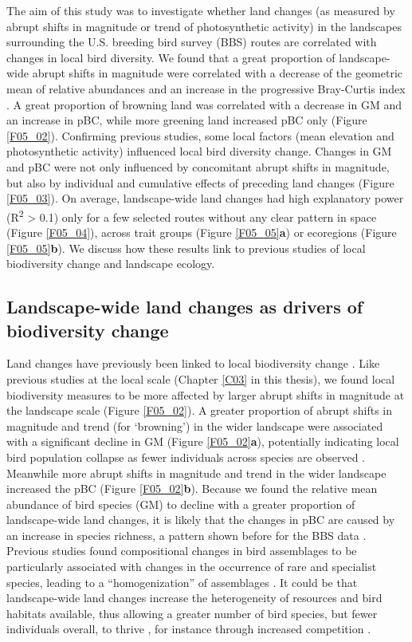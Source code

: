 The aim of this study was to investigate whether land changes (as measured by abrupt shifts in magnitude or trend of photosynthetic activity) in the landscapes surrounding the U.S. breeding bird survey (BBS) routes are correlated with changes in local bird diversity. We found that a great proportion of landscape-wide abrupt shifts in magnitude were correlated with a decrease of the geometric mean of relative abundances \citep[GM, ][]{Buckland2011} and an increase in the progressive Bray-Curtis index \citep[pBC, ][]{Rittenhouse2010}. A great proportion of browning land was correlated with a decrease in GM and an increase in pBC, while more greening land increased pBC only (Figure \ref{F05_02}). Confirming previous studies, some local factors (\eg mean elevation and photosynthetic activity) influenced local bird diversity change. Changes in GM and pBC were not only influenced by concomitant abrupt shifts in magnitude, but also by individual and cumulative effects of preceding land changes (Figure \ref{F05_03}). On average, landscape-wide land changes had high explanatory power (R\textsuperscript{2} > 0.1) only for a few selected routes without any clear pattern in space (Figure \ref{F05_04}), across trait groups (Figure \ref{F05_05}\textbf{a}) or ecoregions (Figure \ref{F05_05}\textbf{b}).  We discuss how these results link to previous studies of local biodiversity change and landscape ecology. 

\subsection{Landscape-wide land changes as drivers of biodiversity change}
\label{C05_0401}

Land changes have previously been linked to local biodiversity change \citep{Brooks2002,Ewers2013,Cousins2015}. Like previous studies at the local scale (Chapter \ref{C03} in this thesis), we found local biodiversity measures to be more affected by larger abrupt shifts in magnitude at the landscape scale (Figure \ref{F05_02}). A greater proportion of abrupt shifts in magnitude and trend (for ‘browning’) in the wider landscape were associated with a significant decline in GM (Figure \ref{F05_02}\textbf{a}), potentially indicating local bird population collapse as fewer individuals across species are observed \citep{Loh2005,Buckland2011}. Meanwhile more abrupt shifts in magnitude and trend in the wider landscape increased the pBC (Figure \ref{F05_02}\textbf{b}). Because we found the relative mean abundance of bird species (GM) to decline with a greater proportion of landscape-wide land changes, it is likely that the changes in pBC are caused by an increase in species richness, a pattern shown before for the BBS data \citep{Schipper2016}. Previous studies found compositional changes in bird assemblages to be particularly associated with changes in the occurrence of rare and specialist species, leading to a “homogenization” of assemblages \citep{McKinney1999,Olden2006a,Newbold2018}. It could be that landscape-wide land changes increase the heterogeneity of resources and bird habitats available, thus allowing a greater number of bird species, but fewer individuals overall, to   thrive \citep{Holt2009,Stein2014}, for instance through increased competition \citep{RandallHughes2007}. 

